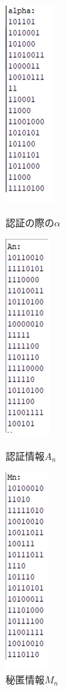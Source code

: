 \begin{figure}[H]
\begin{minipage}{0.33\hsize}
\centering
\includegraphics{alpha.png}
\caption{認証の際の$\alpha$}
\label{fig:alpha}
\end{minipage}
\begin{minipage}{0.33\hsize}
\centering
\includegraphics{beta_An.png}
\caption{認証情報$A_n$}
\label{fig:beta_An}
\end{minipage}
\begin{minipage}{0.33\hsize}
\centering
\includegraphics{beta_Mn.png}
\caption{秘匿情報$M_n$}
\label{fig:beta_Mn}
\end{minipage}
\end{figure}

